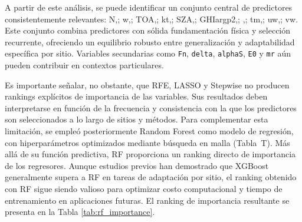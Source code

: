 A partir de este análisis, se puede identificar un conjunto central de predictores consistentemente relevantes: {N,; w,; TOA,; kt,; SZA,; GHIargp2,; ,; tm,; uw,; vw}. Este conjunto combina predictores con sólida fundamentación física y selección recurrente, ofreciendo un equilibrio robusto entre generalización y adaptabilidad específica por sitio. Variables secundarias como \texttt{Fn}, \texttt{delta}, \texttt{alphaS}, \texttt{E0} y \texttt{mr} aún pueden contribuir en contextos particulares.\

Es importante señalar, no obstante, que RFE, LASSO y Stepwise no producen rankings explícitos de importancia de las variables. Sus resultados deben interpretarse en función de la frecuencia y consistencia con la que los predictores son seleccionados a lo largo de sitios y métodos. Para complementar esta limitación, se empleó posteriormente Random Forest como modelo de regresión, con hiperparámetros optimizados mediante búsqueda en malla (Tabla~T). Más allá de su función predictiva, RF proporciona un ranking directo de importancia de los regresores. Aunque estudios previos \cite{SALAMALIKIS2022} han demostrado que XGBoost generalmente supera a RF en tareas de adaptación por sitio, el ranking obtenido con RF sigue siendo valioso para optimizar costo computacional y tiempo de entrenamiento en aplicaciones futuras. El ranking de importancia resultante se presenta en la Tabla \ref{tab:rf_importance}.\\


